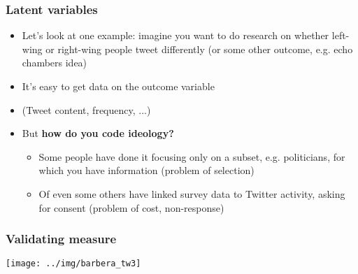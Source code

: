 \documentclass[aspectratio=43]{beamer}
\begin{document}
\begin{frame}
\frametitle{Latent variables}
\centering

\begin{itemize}
  \item Let's look at one example: imagine you want to do research on whether left-wing or right-wing people tweet differently (or some other outcome, e.g. echo chambers idea)
  \item It's easy to get data on the outcome variable
  \item[] (Tweet content, frequency, ...)
  \item But \textbf{how do you code ideology?}
  \begin{itemize}
    \item<2-> Some people have done it focusing only on a subset, e.g. politicians, for which you have information (problem of selection)
    \item<3-> Of even some others have linked survey data to Twitter activity, asking for consent (problem of cost, non-response)
  \end{itemize}
\end{itemize}

\end{frame}



\begin{frame}
\frametitle{Validating measure}
\centering

\texttt{[image: ../img/barbera\_tw3]}

\end{frame}


\end{document}
